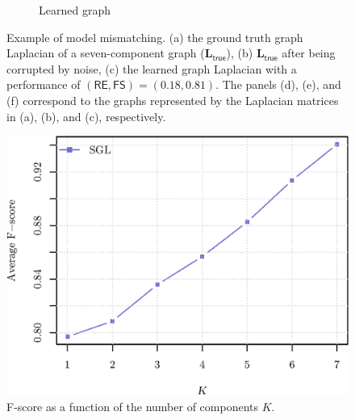 \begin{figure}[!htb]
\begin{subfigure}[b]{0.3\textwidth}
        \caption{Learned graph}
    \end{subfigure}
        \caption{Example of model mismatching. (a) the ground truth graph Laplacian of a seven-component graph
                 ($\mathbf{L}_{\mathsf{true}}$), (b) $\mathbf{L}_{\mathsf{true}}$ after being corrupted by noise,
                 (c) the learned graph Laplacian with a performance of
                 $(\mathsf{RE}, \mathsf{FS}) = (0.18, 0.81)$.
                 The panels (d), (e), and (f) correspond to the graphs represented by the Laplacian matrices in
                 (a), (b), and (c), respectively.}
        \label{fig:7-comp-graph}
\end{figure}

\begin{figure}[!htb]
  \centering
  \includegraphics[width=\textwidth]{model-mismatch/fscore.eps}
  \caption{F-score as a function of the number of components $K$.}
  \label{fig:fscore-k}
\end{figure}

